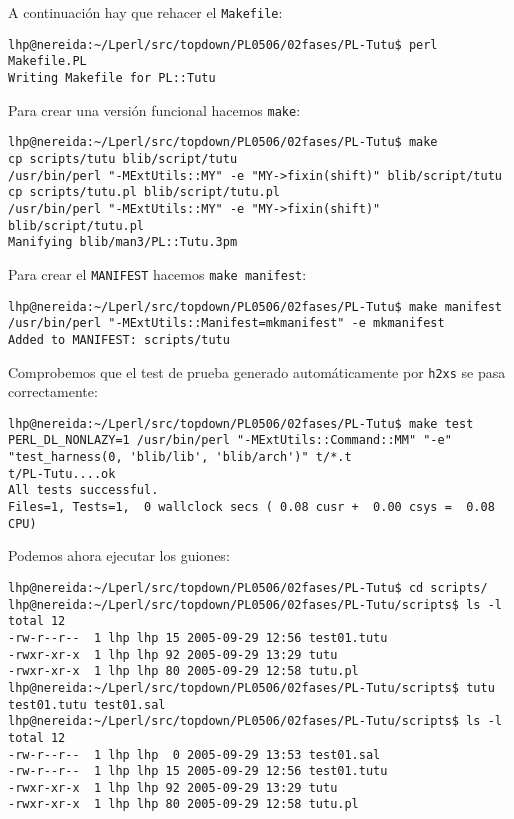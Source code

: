 
A continuación hay que rehacer el \verb|Makefile|:
\begin{verbatim}
lhp@nereida:~/Lperl/src/topdown/PL0506/02fases/PL-Tutu$ perl Makefile.PL
Writing Makefile for PL::Tutu
\end{verbatim}

Para crear una versión funcional hacemos \verb|make|:
\begin{verbatim}
lhp@nereida:~/Lperl/src/topdown/PL0506/02fases/PL-Tutu$ make
cp scripts/tutu blib/script/tutu
/usr/bin/perl "-MExtUtils::MY" -e "MY->fixin(shift)" blib/script/tutu
cp scripts/tutu.pl blib/script/tutu.pl
/usr/bin/perl "-MExtUtils::MY" -e "MY->fixin(shift)" blib/script/tutu.pl
Manifying blib/man3/PL::Tutu.3pm
\end{verbatim}

Para crear el \verb|MANIFEST| hacemos \verb|make manifest|:
\begin{verbatim}
lhp@nereida:~/Lperl/src/topdown/PL0506/02fases/PL-Tutu$ make manifest
/usr/bin/perl "-MExtUtils::Manifest=mkmanifest" -e mkmanifest
Added to MANIFEST: scripts/tutu
\end{verbatim}

Comprobemos que el test de prueba generado automáticamente por
\verb|h2xs| se pasa correctamente:
\begin{verbatim}
lhp@nereida:~/Lperl/src/topdown/PL0506/02fases/PL-Tutu$ make test
PERL_DL_NONLAZY=1 /usr/bin/perl "-MExtUtils::Command::MM" "-e" "test_harness(0, 'blib/lib', 'blib/arch')" t/*.t
t/PL-Tutu....ok
All tests successful.
Files=1, Tests=1,  0 wallclock secs ( 0.08 cusr +  0.00 csys =  0.08 CPU)
\end{verbatim}


Podemos ahora ejecutar los guiones:
\begin{verbatim}
lhp@nereida:~/Lperl/src/topdown/PL0506/02fases/PL-Tutu$ cd scripts/
lhp@nereida:~/Lperl/src/topdown/PL0506/02fases/PL-Tutu/scripts$ ls -l
total 12
-rw-r--r--  1 lhp lhp 15 2005-09-29 12:56 test01.tutu
-rwxr-xr-x  1 lhp lhp 92 2005-09-29 13:29 tutu
-rwxr-xr-x  1 lhp lhp 80 2005-09-29 12:58 tutu.pl
lhp@nereida:~/Lperl/src/topdown/PL0506/02fases/PL-Tutu/scripts$ tutu test01.tutu test01.sal
lhp@nereida:~/Lperl/src/topdown/PL0506/02fases/PL-Tutu/scripts$ ls -l
total 12
-rw-r--r--  1 lhp lhp  0 2005-09-29 13:53 test01.sal
-rw-r--r--  1 lhp lhp 15 2005-09-29 12:56 test01.tutu
-rwxr-xr-x  1 lhp lhp 92 2005-09-29 13:29 tutu
-rwxr-xr-x  1 lhp lhp 80 2005-09-29 12:58 tutu.pl
\end{verbatim}

